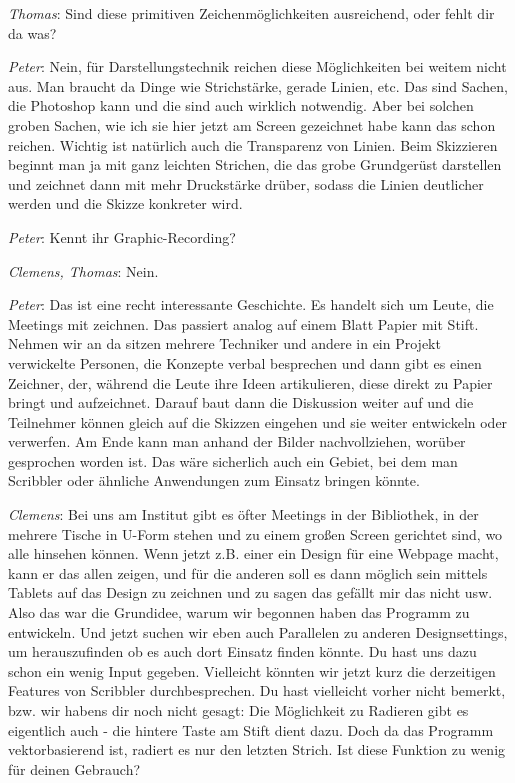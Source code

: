 \medskip \emph{Thomas}: Sind diese primitiven Zeichenmöglichkeiten ausreichend, oder fehlt dir da was?

\medskip \emph{Peter}: Nein, für Darstellungstechnik reichen diese Möglichkeiten bei weitem nicht aus. Man braucht da Dinge wie Strichstärke, gerade Linien, etc. Das sind Sachen, die Photoshop kann und die sind auch wirklich notwendig. Aber bei solchen groben Sachen, wie ich sie hier jetzt am Screen gezeichnet habe kann das schon reichen. Wichtig ist natürlich auch die Transparenz von Linien. Beim Skizzieren beginnt man ja mit ganz leichten Strichen, die das grobe Grundgerüst darstellen und zeichnet dann mit mehr Druckstärke drüber, sodass die Linien deutlicher werden und die Skizze konkreter wird.

\medskip \emph{Peter}: Kennt ihr Graphic-Recording?

\medskip \emph{Clemens, Thomas}: Nein.

\medskip \emph{Peter}: Das ist eine recht interessante Geschichte. Es handelt sich um Leute, die Meetings mit zeichnen. Das passiert analog auf einem Blatt Papier mit Stift. Nehmen wir an da sitzen mehrere Techniker und andere in ein Projekt verwickelte Personen, die Konzepte verbal besprechen und dann gibt es einen Zeichner, der, während die Leute ihre Ideen artikulieren, diese direkt zu Papier bringt und aufzeichnet. Darauf baut dann die Diskussion weiter auf und die Teilnehmer können gleich auf die Skizzen eingehen und sie weiter entwickeln oder verwerfen. Am Ende kann man anhand der Bilder nachvollziehen, worüber gesprochen worden ist. Das wäre sicherlich auch ein Gebiet, bei dem man Scribbler oder ähnliche Anwendungen zum Einsatz bringen könnte.

\medskip \emph{Clemens}: Bei uns am Institut gibt es öfter Meetings in der Bibliothek, in der mehrere Tische in U-Form stehen und zu einem großen Screen gerichtet sind, wo alle hinsehen können. Wenn jetzt z.B. einer ein Design für eine Webpage macht, kann er das allen zeigen, und für die anderen soll es dann möglich sein mittels Tablets auf das Design zu zeichnen und zu sagen das gefällt mir das nicht usw. Also das war die Grundidee, warum wir begonnen haben das Programm zu entwickeln. Und jetzt suchen wir eben auch Parallelen zu anderen Designsettings, um herauszufinden ob es auch dort Einsatz finden könnte. Du hast uns dazu schon ein wenig Input gegeben. Vielleicht könnten wir jetzt kurz die derzeitigen Features von Scribbler durchbesprechen. Du hast vielleicht vorher nicht bemerkt, bzw. wir habens dir noch nicht gesagt: Die Möglichkeit zu Radieren gibt es eigentlich auch - die hintere Taste am Stift dient dazu. Doch da das Programm vektorbasierend ist, radiert es nur den letzten Strich. Ist diese Funktion zu wenig für deinen Gebrauch?

